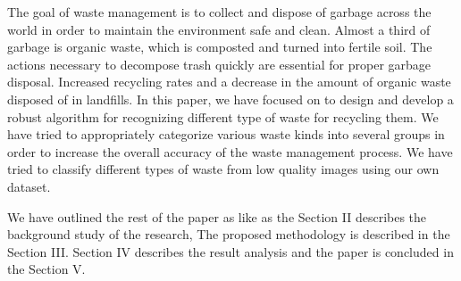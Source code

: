 \documentclass[conference]{IEEEtran}
\begin{document}
The goal of waste management is to collect and dispose of garbage across the world in order to maintain the environment safe and clean. Almost a third of garbage is organic waste, which is composted and turned into fertile soil. The actions necessary to decompose trash quickly are essential for proper garbage disposal. Increased recycling rates and a decrease in the amount of organic waste disposed of in landfills. In this paper, we have focused on to design and develop a robust algorithm for recognizing different type of waste for recycling them. We have tried to appropriately categorize various waste kinds into several groups in order to increase the overall accuracy of the waste management process. We have tried to classify different types of waste from low quality images using our own dataset.

We have outlined the rest of the paper as like as the Section II describes the background study of the research, The proposed methodology is described in the Section III. Section IV describes the result analysis and the paper is concluded in the Section V.
\end{document}
